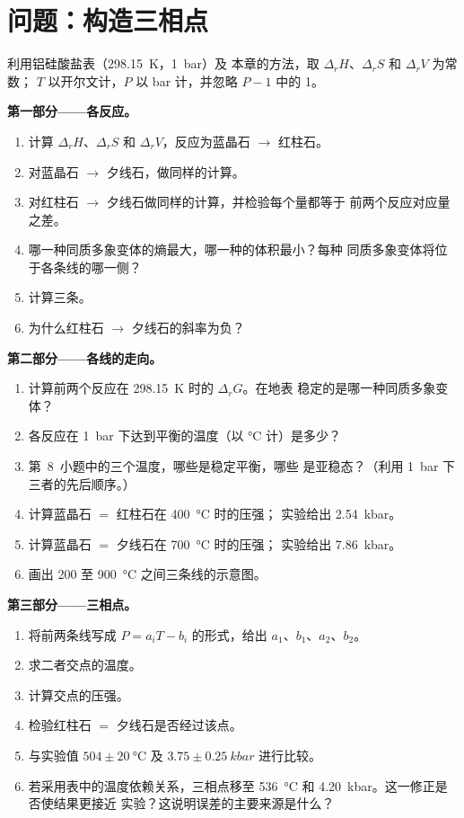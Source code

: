\section{问题：构造三相点}

\begin{problem}
\label{pb:b2:metamorphic-facies:1}
利用铝硅酸盐表（\qty{298.15}{K}，\qty{1}{bar}）及
本章的方法，取 $\Delta_r H$、$\Delta_r S$ 和 $\Delta_r V$ 为常数；
$T$ 以开尔文计，$P$ 以 bar 计，并忽略 $P - 1$ 中的 1。

\noindent\textbf{第一部分——各反应。}
\begin{enumerate}
\item 计算 $\Delta_r H$、$\Delta_r S$ 和 $\Delta_r V$，反应为蓝晶石 $\to$ 红柱石。
\item 对蓝晶石 $\to$ 夕线石，做同样的计算。
\item 对红柱石 $\to$ 夕线石做同样的计算，并检验每个量都等于
前两个反应对应量之差。
\item 哪一种同质多象变体的熵最大，哪一种的体积最小？每种
同质多象变体将位于各条线的哪一侧？
\item 计算三条。
\item 为什么红柱石 $\to$ 夕线石的斜率为负？
\end{enumerate}

\noindent\textbf{第二部分——各线的走向。}
\begin{enumerate}[resume]
\item 计算前两个反应在 \qty{298.15}{K} 时的 $\Delta_r G$。在地表
稳定的是哪一种同质多象变体？
\item 各反应在
\qty{1}{bar} 下达到平衡的温度（以 \unit{\celsius} 计）是多少？
\item 第~8~小题中的三个温度，哪些是稳定平衡，哪些
是亚稳态？（利用 \qty{1}{bar} 下三者的先后顺序。）
\item 计算蓝晶石 $=$ 红柱石在 \qty{400}{\celsius} 时的压强；
实验给出 \qty{2.54}{kbar}。
\item 计算蓝晶石 $=$ 夕线石在 \qty{700}{\celsius} 时的压强；
实验给出 \qty{7.86}{kbar}。
\item 画出 200 至 \qty{900}{\celsius} 之间三条线的示意图。
\end{enumerate}

\noindent\textbf{第三部分——三相点。}
\begin{enumerate}[resume]
\item 将前两条线写成 $P = a_i T - b_i$ 的形式，给出 $a_1$、$b_1$、$a_2$、$b_2$。
\item 求二者交点的温度。
\item 计算交点的压强。
\item 检验红柱石 $=$ 夕线石是否经过该点。
\item 与实验值 $504 \pm \qty{20}{\celsius}$ 及 $3.75 \pm
\qty{0.25}{kbar}$ 进行比较。
\item 若采用表中的温度依赖关系，三相点移至
\qty{536}{\celsius} 和 \qty{4.20}{kbar}。这一修正是否使结果更接近
实验？这说明误差的主要来源是什么？
\end{enumerate}


\end{problem}
